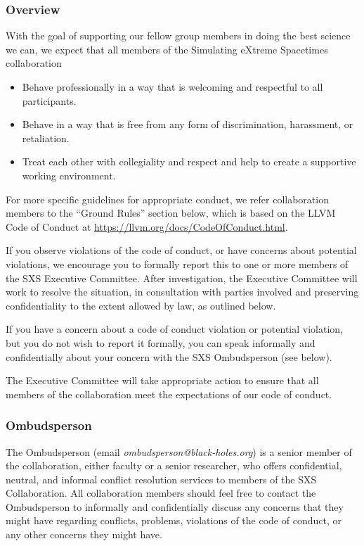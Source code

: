 \subsubsection{Overview} 
With the goal of supporting our fellow group members in doing the best
science we can, we expect that all members of the Simulating eXtreme
Spacetimes collaboration
\begin{itemize} 
\item Behave professionally in a way that is welcoming and respectful
  to all participants.
\item Behave in a way that is free from any form of discrimination,
  harassment, or retaliation.
\item Treat each other with collegiality and respect and help to
  create a supportive working environment.
\end{itemize}
For more specific guidelines for appropriate conduct, we refer
collaboration members to the “Ground Rules” section below, which is
based on the LLVM Code of Conduct at
\url{https://llvm.org/docs/CodeOfConduct.html}.

If you observe violations of the code of conduct, or have concerns about
potential violations, we encourage you to formally report this to one or more
members of the SXS Executive Committee. After investigation, the Executive
Committee will work to resolve the situation, in consultation with parties
involved and preserving confidentiality to the extent allowed by law, as
outlined below. 

If you have a concern about a code of conduct violation or potential
violation, but you do not wish to report it formally, you can speak
informally and confidentially about your concern with the SXS
Ombudsperson (see below).

The Executive Committee will take appropriate action to ensure that
all members of the collaboration meet the expectations of our code of
conduct.

\subsubsection{Ombudsperson}
\label{sec:ombudsperson}
The Ombudsperson (email
\emph{ombudsperson@black-holes.org}) is a senior member of the collaboration, 
either faculty or a senior researcher, who offers confidential, neutral, and
informal conflict resolution services to members of the SXS
Collaboration. All collaboration members should feel free to contact
the Ombudsperson to informally and confidentially discuss any concerns
that they might have regarding conflicts, problems, violations of the
code of conduct, or any other concerns they might have.

